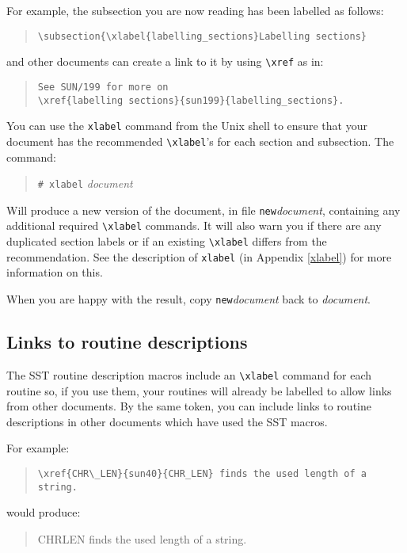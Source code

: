 \documentclass[twoside,11pt]{article}
\newcommand{\htmlref}[2]{#1}
\newcommand{\latex}[1]{#1}
\newcommand{\xref}[3]{#1}
\newcommand{\xlabel}[1]{}
\renewcommand{\_}{\texttt{\symbol{95}}}
\begin{document}
For example, the subsection you are now reading has been labelled as follows:

\begin{quote}
\verb+\subsection{\xlabel{labelling_sections}Labelling sections}+
\end{quote}

and other documents can create a link to it by using \verb+\xref+ as in:

\begin{quote}
\begin{verbatim}
See SUN/199 for more on
\xref{labelling sections}{sun199}{labelling_sections}.
\end{verbatim}
\end{quote}

You can use the \texttt{xlabel} command from the Unix shell to ensure that your
document has the recommended \verb+\xlabel+'s for each section and subsection.
The command:
\begin{quote}
\texttt{\# xlabel} \textit{document}
\end{quote}
Will produce a new version of the document, in file
\texttt{new}\textit{document},
containing any additional required \verb+\xlabel+ commands.
It will also warn you if there are any duplicated section labels or if an
existing  \verb+\xlabel+ differs from the recommendation.
See the
\htmlref{description of \texttt{xlabel}}{xlabel}
\latex{(in Appendix \ref{xlabel})} for more information on this.

When you are happy with the result, copy \texttt{new}\textit{document} back to
\textit{document}.

\subsection{\xlabel{links_to_routine_descriptions}Links to routine descriptions}

The SST routine description macros include an \verb#\xlabel# command for
each routine so, if you use them, your routines will
already be labelled to allow links from other documents. By the same token,
you can include links to routine descriptions in other documents which have
used the SST macros.

For example:
\begin{quote}
\begin{verbatim}
\xref{CHR\_LEN}{sun40}{CHR_LEN} finds the used length of a string.
\end{verbatim}
\end{quote}
\begin{htmlonly}
would produce:
\begin{quote}
\xref{CHR\_LEN}{sun40}{CHR_LEN} finds the used length of a string.
\end{quote}
\end{htmlonly}
\end{document}
